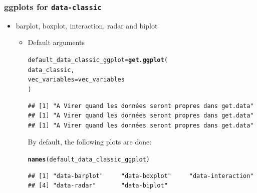 \documentclass{article}\usepackage[]{graphicx}\usepackage[]{color}
\makeatletter
\newcommand{\hlstd}[1]{\textcolor[rgb]{0.345,0.345,0.345}{#1}}%
\newcommand{\hlkwb}[1]{\textcolor[rgb]{0.69,0.353,0.396}{#1}}%
\newcommand{\hlkwc}[1]{\textcolor[rgb]{0.333,0.667,0.333}{#1}}%
\newcommand{\hlkwd}[1]{\textcolor[rgb]{0.737,0.353,0.396}{\textbf{#1}}}%
\newenvironment{kframe}{%
 \def\at@end@of@kframe{}%
 \ifinner\ifhmode%
  \def\at@end@of@kframe{\end{minipage}}%
  \begin{minipage}{\columnwidth}%
 \fi\fi%
 \def\FrameCommand##1{\hskip\@totalleftmargin \hskip-\fboxsep
 \colorbox{shadecolor}{##1}\hskip-\fboxsep
     \hskip-\linewidth \hskip-\@totalleftmargin \hskip\columnwidth}%
 \MakeFramed {\advance\hsize-\width
   \@totalleftmargin\z@ \linewidth\hsize
   \@setminipage}}%
 {\par\unskip\endMakeFramed%
 \at@end@of@kframe}
\newenvironment{knitrout}{}{} %
\makeatother
\begin{document}
\subsubsection{ggplots for \texttt{data-classic} }

\begin{itemize}

\item barplot, boxplot, interaction, radar and biplot

\begin{itemize}

\item Default arguments
\begin{knitrout}
\color{fgcolor}\begin{kframe}
\begin{alltt}
\hlstd{default_data_classic_ggplot} \hlkwb{=} \hlkwd{get.ggplot}\hlstd{(}
        \hlstd{data_classic,}
        \hlkwc{vec_variables} \hlstd{= vec_variables}
        \hlstd{)}
\end{alltt}


{\ttfamily\noindent\itshape\color{messagecolor}{\#\# As ggplot.type is NULL, ggplot.Type is set to data-barplot, data-boxplot, data-interaction, data-radar, data-biplot\\\#\# As x.axis and in.col are NULL, all the combinaisons of x.axis and in.col are done for data-barplot, data-boxplot and data-interaction.\\\#\# As in.col is NULL, each in.col are done for data-radar and data-biplot.}}\begin{verbatim}
## [1] "A Virer quand les données seront propres dans get.data"
## [1] "A Virer quand les données seront propres dans get.data"
## [1] "A Virer quand les données seront propres dans get.data"
\end{verbatim}


{\ttfamily\noindent\itshape{}}\end{kframe}
\end{knitrout}

By default, the following plots are done:
\begin{knitrout}
\color{fgcolor}\begin{kframe}
\begin{alltt}
\hlkwd{names}\hlstd{(default_data_classic_ggplot)}
\end{alltt}
\begin{verbatim}
## [1] "data-barplot"     "data-boxplot"     "data-interaction"
## [4] "data-radar"       "data-biplot"
\end{verbatim}
\end{kframe}
\end{knitrout}


\end{itemize}
\end{itemize}
\end{document}
